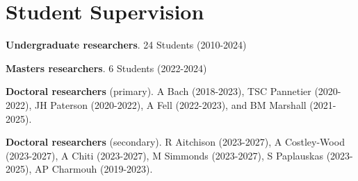 \documentclass[letterpaper]{article}
\renewenvironment{itemize}{
  \begin{list}{}{
    \setlength{\leftmargin}{1.5em}
  }
}{
  \end{list}
}
\begin{document}
\section*{Student Supervision}
\begin{itemize}
\item {\bf Undergraduate researchers}. 24 Students (2010-2024) %
\item {\bf Masters researchers}. 6 Students (2022-2024)
\item {\bf Doctoral researchers} (primary). A Bach (2018-2023), TSC Pannetier (2020-2022), JH Paterson (2020-2022), A Fell (2022-2023), and BM Marshall (2021-2025).
\item {\bf Doctoral researchers} (secondary). R Aitchison (2023-2027), A Costley-Wood (2023-2027), A Chiti (2023-2027), M Simmonds (2023-2027), S Paplauskas (2023-2025), AP Charmouh (2019-2023).
\end{itemize}
\end{document}
